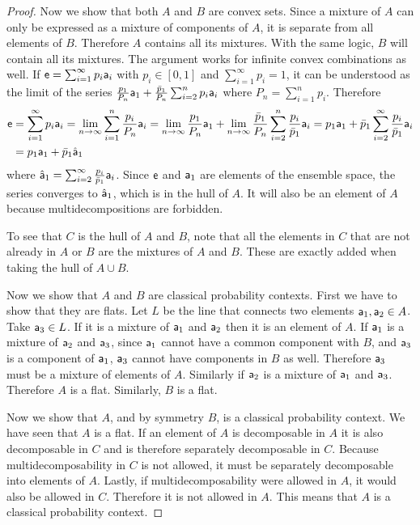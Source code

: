 \begin{mathSection}
\begin{proof}
	Now we show that both $A$ and $B$ are convex sets. Since a mixture of $A$ can only be expressed as a mixture of components of $A$, it is separate from all elements of $B$. Therefore $A$ contains all its mixtures. With the same logic, $B$ will contain all its mixtures. The argument works for infinite convex combinations as well. If $\ens = \sum_{i=1}^{\infty} p_i \ens[a]_i$ with $p_i \in [0,1]$ and $\sum_{i=1}^{\infty} p_i = 1$, it can be understood as the limit of the series $\frac{p_1}{P_n} \ens[a]_1 + \frac{\bar{p}_1}{P_n} \sum_{i=2}^{n} p_i \ens[a]_i$ where $P_n = \sum_{i=1}^{n} p_i$. Therefore
	\begin{equation}
		\begin{aligned}
			\ens &= \sum_{i=1}^{\infty} p_i \ens[a]_i = \lim\limits_{n \to \infty}  \sum_{i=1}^{n} \frac{p_i}{P_n} \ens[a]_i = \lim\limits_{n \to \infty} \frac{p_1}{P_n} \ens[a]_1 + \lim\limits_{n \to \infty}\frac{\bar{p}_1}{P_n} \sum_{i=2}^{n} \frac{p_i}{\bar{p}_1} \ens[a]_i = p_1 \ens[a]_1 + \bar{p}_1 \sum_{i=2}^{\infty} \frac{p_i}{\bar{p}_1} \ens[a]_i \\
			&= p_1 \ens[a]_1 + \bar{p}_1 \hat{\ens[a]}_1
		\end{aligned}
	\end{equation}
	where $\hat{\ens[a]}_1 = \sum_{i=2}^{\infty} \frac{p_i}{\bar{p}_1} \ens[a]_i$. Since $\ens$ and $\ens[a]_1$ are elements of the ensemble space, the series converges to $\hat{\ens[a]}_1$, which is in the hull of $A$. It will also be an element of $A$ because multidecompositions are forbidden.
	
	To see that $C$ is the hull of $A$ and $B$, note that all the elements in $C$ that are not already in $A$ or $B$ are the mixtures of $A$ and $B$. These are exactly added when taking the hull of $A \cup B$.
	
	Now we show that $A$ and $B$ are classical probability contexts. First we have to show that they are flats. Let $L$ be the line that connects two elements $\ens[a]_1, \ens[a]_2 \in A$. Take $\ens[a]_3 \in L$. If it is a mixture of $\ens[a]_1$ and $\ens[a]_2$ then it is an element of $A$. If $\ens[a]_1$ is a mixture of $\ens[a]_2$ and $\ens[a]_3$, since $\ens[a]_1$ cannot have a common component with $B$, and $\ens[a]_3$ is a component of $\ens[a]_1$, $\ens[a]_3$ cannot have components in $B$ as well. Therefore $\ens[a]_3$ must be a mixture of elements of $A$. Similarly if $\ens[a]_2$ is a mixture of $\ens[a]_1$ and $\ens[a]_3$. Therefore $A$ is a flat. Similarly, $B$ is a flat.
	
	Now we show that $A$, and by symmetry $B$, is a classical probability context. We have seen that $A$ is a flat. If an element of $A$ is decomposable in $A$ it is also decomposable in $C$ and is therefore separately decomposable in $C$. Because multidecomposability in $C$ is not allowed, it must be separately decomposable into elements of $A$. Lastly, if multidecomposability were allowed in $A$, it would also be allowed in $C$. Therefore it is not allowed in $A$. This means that $A$ is a classical probability context.
\end{proof}


\end{mathSection}
